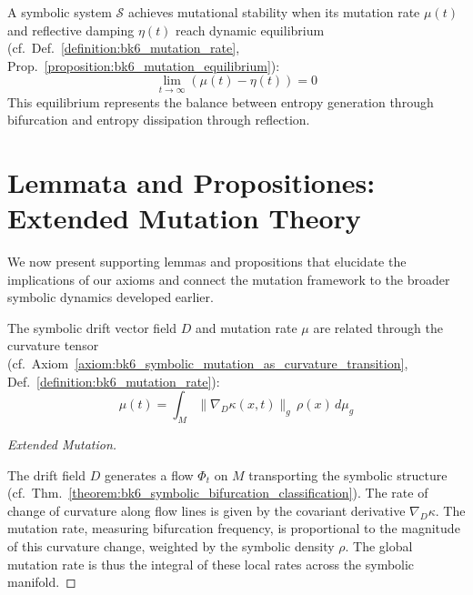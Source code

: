 \begin{axiom}
\label{axiom:bk6_equilibrium_of_mutability}
A symbolic system $\mathcal{S}$ achieves mutational stability when its mutation rate $\mu(t)$ and reflective damping $\eta(t)$ reach dynamic equilibrium (cf.~Def.~\ref{definition:bk6_mutation_rate}, Prop.~\ref{proposition:bk6_mutation_equilibrium}):
\begin{equation}
\lim_{t \to \infty} (\mu(t) - \eta(t)) = 0
\end{equation}
This equilibrium represents the balance between entropy generation through bifurcation and entropy dissipation through reflection.
\end{axiom}
\section{Lemmata and Propositiones: Extended Mutation Theory}
\label{sec:bk6_lemmata_and_propositiones_extended_mutation_theory}
We now present supporting lemmas and propositions that elucidate the implications of our axioms and connect the mutation framework to the broader symbolic dynamics developed earlier.
\begin{lemma}
\label{lemma:bk6_symbolic_drift_mutation_relation}
The symbolic drift vector field $D$ and mutation rate $\mu$ are related through the curvature tensor (cf.~Axiom~\ref{axiom:bk6_symbolic_mutation_as_curvature_transition}, Def.~\ref{definition:bk6_mutation_rate}):
\begin{equation}
\mu(t) = \int_M \|\nabla_{D} \kappa(x,t)\|_g \, \rho(x) \, d\mu_g
\end{equation}
\begin{proof}[Extended Mutation]
\label{proof:bk6_extended_mutation}
\leavevmode

The drift field $D$ generates a flow $\Phi_t$ on $M$ transporting the symbolic structure
(cf.~Thm.~\ref{theorem:bk6_symbolic_bifurcation_classification}). The rate of change of curvature along flow lines is given by the covariant derivative $\nabla_D \kappa$. The mutation rate, measuring bifurcation frequency, is proportional to the magnitude of this curvature change, weighted by the symbolic density $\rho$. The global mutation rate is thus the integral of these local rates across the symbolic manifold.
\end{proof}
\end{lemma}
